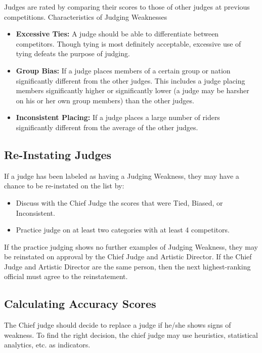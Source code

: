 Judges are rated by comparing their scores to those of other judges at previous competitions.
Characteristics of Judging Weaknesses
\begin{itemize}
\item \textbf{Excessive Ties:} A judge should be able to differentiate between competitors.
Though tying is most definitely acceptable, excessive use of tying defeats the purpose of judging.
\item \textbf{Group Bias:} If a judge places members of a certain group or nation significantly different from the other judges.
This includes a judge placing members significantly higher or significantly lower (a judge may be harsher on his or her own group members) than the other judges.
\item \textbf{Inconsistent Placing:} If a judge places a large number of riders significantly different from the average of the other judges.
\end{itemize}

\subsection{Re-Instating Judges}

If a judge has been labeled as having a Judging Weakness, they may have a chance to be re-instated on the list by:
\begin{itemize} 
\item Discuss with the Chief Judge the scores that were Tied, Biased, or Inconsistent.
\item Practice judge on at least two categories with at least 4 competitors.
\end{itemize}
If the practice judging shows no further examples of Judging Weakness, they may be reinstated on approval by the Chief Judge and Artistic Director.
If the Chief Judge and Artistic Director are the same person, then the next highest-ranking official must agree to the reinstatement.

\subsection{Calculating Accuracy Scores \label{subsec:freestyle_judging-panel_calculating-accuracy-scores}}

The Chief judge should decide to replace a judge if he/she shows signs of weakness.
To find the right decision, the chief judge may use heuristics, statistical analytics, etc. as indicators.

